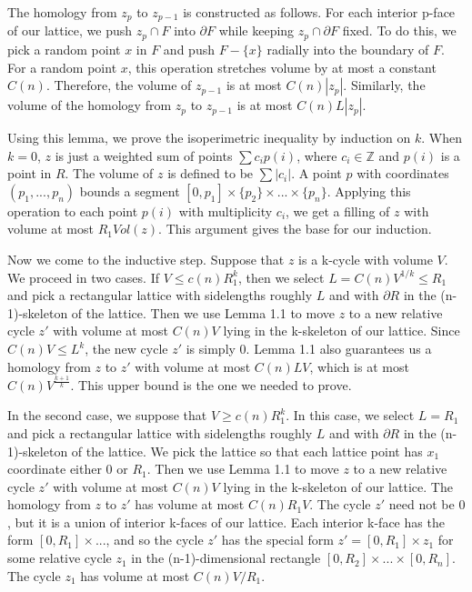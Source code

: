 \documentclass{amsart}
\newtheorem*{Theorem 1}{Theorem 1}
\newtheorem*{Theorem 2}{Theorem 2}
\newtheorem*{Estimate 1}{Estimate 1}
\newtheorem*{Estimate 2}{Estimate 2}
\newtheorem*{key lemma}{Key Lemma}
\numberwithin{equation}{section}
\begin{document}
The homology from $z_p$ to $z_{p-1}$ is constructed as follows. 
For each interior p-face of our lattice, we push $z_p \cap F$
into $\partial F$ while keeping $z_p \cap \partial F$ fixed.  To
do this, we pick a random point $x$ in $F$ and push $F - \{ x \}$
radially into the boundary of $F$. For a random point $x$, this
operation stretches volume by at most a constant $C(n)$. 
Therefore, the volume of $z_{p-1}$ is at most $C(n) |z_p|$. 
Similarly, the volume of the homology from $z_p$ to $z_{p-1}$ is
at most $C(n) L |z_p|$. \endproof

Using this lemma, we prove the isoperimetric inequality by
induction on $k$. When $k=0$, $z$ is just a weighted sum of
points $\sum c_i p(i)$, where $c_i \in \mathbb{Z}$ and $p(i)$ is
a point in $R$.  The volume of $z$ is defined to be $\sum |c_i|$. 
A point $p$ with coordinates $(p_1, ..., p_n)$ bounds a segment
$[0, p_1] \times \{ p_2 \} \times ... \times \{ p_n \}$. 
Applying this operation to each point $p(i)$ with multiplicity
$c_i$, we get a filling of $z$ with volume at most $R_1 Vol(z)$.
This argument gives the base for our induction.

Now we come to the inductive step.  Suppose that $z$ is a k-cycle
with volume $V$.  We proceed in two cases.  If $V \le c(n)
R_1^k$, then we select $L = C(n) V^{1/k} \le R_1$ and pick a
rectangular lattice with sidelengths roughly $L$ and with
$\partial R$ in the (n-1)-skeleton of the lattice. Then we use
Lemma 1.1 to move $z$ to a new relative cycle $z'$ with volume at
most $C(n) V$ lying in the k-skeleton of our lattice. Since $C(n)
V \le L^k$, the new cycle $z'$ is simply $0$.  Lemma 1.1 also
guarantees us a homology from $z$ to $z'$ with volume at most
$C(n) L V$, which is at most $C(n) V^{\frac{k+1}{k}}$.  This
upper bound is the one we needed to prove.

In the second case, we suppose that $V \ge c(n) R_1^k$.  In this
case, we select $L = R_1$ and pick a rectangular lattice with
sidelengths roughly $L$ and with $\partial R$ in the
(n-1)-skeleton of the lattice.  We pick the lattice so that each
lattice point has $x_1$ coordinate either $0$ or $R_1$. Then we
use Lemma 1.1 to move $z$ to a new relative cycle $z'$ with
volume at most $C(n) V$ lying in the k-skeleton of our lattice. 
The homology from $z$ to $z'$ has volume at most $C(n) R_1 V$. 
The cycle $z'$ need not be $0$, but it is a union of interior
k-faces of our lattice.  Each interior k-face has the form $[0,
R_1] \times ...$, and so the cycle $z'$ has the special form $z'
= [0, R_1] \times z_1$ for some relative cycle $z_1$ in the
(n-1)-dimensional rectangle $[0, R_2] \times ... \times [0,
R_n]$.  The cycle $z_1$ has volume at most $C(n) V / R_1$.
\end{document}
